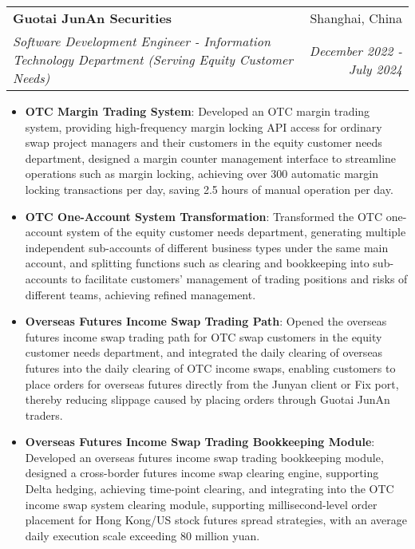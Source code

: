 \documentclass[letterpaper,11pt]{article}
\makeatletter
\newcommand{\resumeItem}[2]{
  \item\small{
    \textbf{#1}{: #2 \vspace{-2pt}}
  }
}
\newcommand{\resumeSubheading}[4]{
  \vspace{-1pt}\item
    \begin{tabular*}{0.97\textwidth}[t]{l@{\extracolsep{\fill}}r}
      \textbf{#1} & #2 \\
      \textit{\small#3} & \textit{\small #4} \\
    \end{tabular*}\vspace{-5pt}
}
\newcommand{\resumeItemListStart}{\begin{itemize}}
\newcommand{\resumeItemListEnd}{\end{itemize}\vspace{-5pt}}
\makeatother
\begin{document}
\resumeSubheading
{Guotai JunAn Securities}{Shanghai, China}
{Software Development Engineer - Information Technology Department (Serving Equity Customer Needs)}{December 2022 - July 2024}
\resumeItemListStart
\resumeItem{OTC Margin Trading System}
{Developed an OTC margin trading system, providing high-frequency margin locking API access for ordinary swap project managers and their customers in the equity customer needs department, designed a margin counter management interface to streamline operations such as margin locking, achieving over 300 automatic margin locking transactions per day, saving 2.5 hours of manual operation per day.}
\resumeItem{OTC One-Account System Transformation}
{Transformed the OTC one-account system of the equity customer needs department, generating multiple independent sub-accounts of different business types under the same main account, and splitting functions such as clearing and bookkeeping into sub-accounts to facilitate customers' management of trading positions and risks of different teams, achieving refined management.}
\resumeItem{Overseas Futures Income Swap Trading Path}
{Opened the overseas futures income swap trading path for OTC swap customers in the equity customer needs department, and integrated the daily clearing of overseas futures into the daily clearing of OTC income swaps, enabling customers to place orders for overseas futures directly from the Junyan client or Fix port, thereby reducing slippage caused by placing orders through Guotai JunAn traders.}
\resumeItem{Overseas Futures Income Swap Trading Bookkeeping Module}
{Developed an overseas futures income swap trading bookkeeping module, designed a cross-border futures income swap clearing engine, supporting Delta hedging, achieving time-point clearing, and integrating into the OTC income swap system clearing module, supporting millisecond-level order placement for Hong Kong/US stock futures spread strategies, with an average daily execution scale exceeding 80 million yuan.}
\resumeItemListEnd
\end{document}
